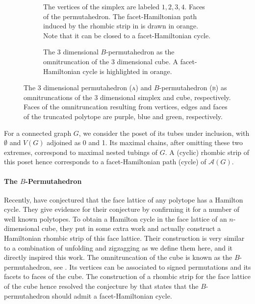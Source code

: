 \documentclass[fontsize=11pt,a4paper,DIV=12]{scrartcl}
\begin{document}
\begin{figure}
	\centering
	\begin{subfigure}[b]{0.49\textwidth}
		\centering
		
		\caption{The vertices of the simplex are labeled $1,2,3,4$. Faces of the permutahedron. The facet-Hamiltonian path induced by the rhombic strip in  is drawn in orange. Note that it can be closed to a facet-Hamiltonian cycle.}
		\label{fig:perm as truncation}
	\end{subfigure}
	\hfill
	\begin{subfigure}[b]{0.49\textwidth}
		\centering
		
		\caption{The 3 dimensional $B$-permutahedron as the omnitruncation of the 3 dimensional cube. A facet-Hamiltonian cycle is highlighted in orange.}
		\label{fig:Bperm}
	\end{subfigure}
	\caption{The 3 dimensional permutahedron (\textsc{a}) and $B$-permutahedron (\textsc{b}) as omnitruncations of the 3 dimensional simplex and cube, respectively. Faces of the omnitruncation resulting from vertices, edges and faces of the truncated polytope are purple, blue and green, respectively.}
	\label{fig:omnitruncation}
\end{figure}
For a connected graph $G$, we consider the poset of its tubes under inclusion, with $\emptyset$ and $V(G)$ adjoined as 0 and 1. Its maximal chains, after omitting these two extremes, correspond to maximal nested tubings of $G$. A (cyclic) rhombic strip of this poset hence corresponds to a facet-Hamiltonian path (cycle) of $\mathcal A(G)$.

\paragraph{The $B$-Permutahedron}
Recently, \textcite{Listing_faces} have conjectured that the face lattice of any polytope has a Hamilton cycle. They give evidence for their conjecture by confirming it for a number of well known polytopes. To obtain a Hamilton cycle in the face lattice of an $n$-dimensional cube, they put in some extra work and actually construct a Hamiltonian rhombic strip of this face lattice. Their construction is very similar to a combination of unfolding and zigzagging as we define them here, and it directly inspired this work. The omnitruncation of the cube is known as the $B$-permutahedron, see . Its vertices can be associated to signed permutations and its facets to faces of the cube. The construction of a rhombic strip for the face lattice of the cube hence resolved the conjecture by \textcite{facethamiltonicity} that states that the $B$-permutahedron should admit a facet-Hamiltonian cycle.
\end{document}
